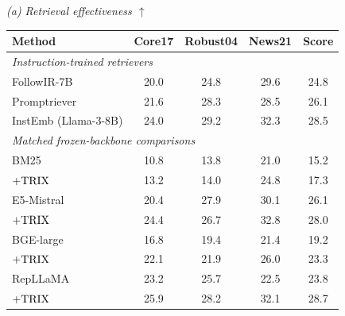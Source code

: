 \documentclass[letterpaper]{article}
\newcommand{\method}{\ifmmode \mathrm{TRIX}\else TRIX\xspace\fi}
\begin{document}
\begin{table}[htbp]
\centering
\small
\setlength{\tabcolsep}{3.2pt}
\textit{(a) Retrieval effectiveness $\uparrow$}\par\smallskip
\begin{tabular}{lcccc}
\toprule
\textbf{Method} & \textbf{Core17} & \textbf{Robust04} &
\textbf{News21} & \textbf{Score} \\
\midrule
\multicolumn{5}{l}{\emph{Instruction-trained retrievers}} \\
FollowIR-7B & 20.0 & 24.8 & 29.6 & 24.8 \\
Promptriever & 21.6 & 28.3 & 28.5 & 26.1 \\
InstEmb (Llama-3-8B) & 24.0 & 29.2 & 32.3 & 28.5 \\
\midrule
\multicolumn{5}{l}{\emph{Matched frozen-backbone comparisons}} \\
BM25 & 10.8 & 13.8 & 21.0 & 15.2 \\
\quad $+\method$ & 13.2 & 14.0 & 24.8 & 17.3 \\
E5-Mistral & 20.4 & 27.9 & 30.1 & 26.1 \\
\quad $+\method$ & 24.4 & 26.7 & 32.8 & 28.0 \\
BGE-large & 16.8 & 19.4 & 21.4 & 19.2 \\
\quad $+\method$ & 22.1 & 21.9 & 26.0 & 23.3 \\
RepLLaMA & 23.2 & 25.7 & 22.5 & 23.8 \\
\quad $+\method$ & 25.9 & 28.2 & 32.1 & 28.7 \\
\bottomrule
\end{tabular}


\end{table}
\end{document}
